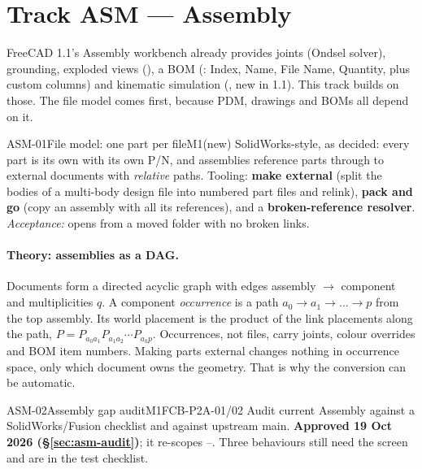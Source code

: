 \section{Track ASM --- Assembly}\label{sec:asm}

FreeCAD 1.1's Assembly workbench already provides joints (Ondsel solver), grounding, exploded views
(), a BOM (: Index, Name, File Name, Quantity, plus custom
columns) and kinematic simulation (, new in 1.1). This track builds on
those. The file model comes first, because PDM, drawings and BOMs all depend on it.

\begin{epic}{ASM-01}{File model: one part per file}{M1}{\stTodo}{(new)}
SolidWorks-style, as decided: every part is its own  with its own P/N, and assemblies
reference parts through  to external documents with \emph{relative} paths. Tooling:
\textbf{make external} (split the bodies of a multi-body design file into numbered part files and relink),
\textbf{pack and go} (copy an assembly with all its references), and a \textbf{broken-reference resolver}.
\emph{Acceptance:}  opens from a moved folder with no broken links.
\end{epic}

\paragraph{Theory: assemblies as a DAG.} Documents form a directed acyclic graph with edges assembly
$\rightarrow$ component and multiplicities $q$. A component \emph{occurrence} is a path
$a_0\to a_1\to\dots\to p$ from the top assembly. Its world placement is the product of the link placements
along the path, $P = P_{a_0a_1}P_{a_1a_2}\cdots P_{a_kp}$. Occurrences, not files, carry joints, colour
overrides and BOM item numbers. Making parts external changes nothing in occurrence space, only which
document owns the geometry. That is why the conversion can be automatic.

\begin{epic}{ASM-02}{Assembly gap audit}{M1}{\stDone}{FCB-P2A-01/02}
Audit current Assembly against a SolidWorks/Fusion checklist and against upstream main. \textbf{Approved
19 Oct 2026 (\S\ref{sec:asm-audit})}; it re-scopes --. Three behaviours still need the
screen and are in the test checklist.
\end{epic}

